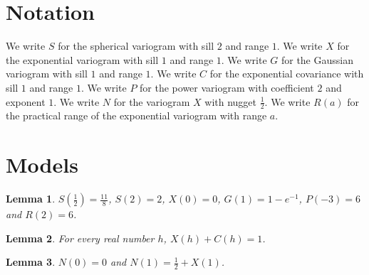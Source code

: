 \documentclass{article}
\newtheorem{lemma}{Lemma}
\begin{document}
\section{Notation}

We write $S$ for the spherical variogram with sill $2$ and range $1$.
We write $X$ for the exponential variogram with sill $1$ and range $1$.
We write $G$ for the Gaussian variogram with sill $1$ and range $1$.
We write $C$ for the exponential covariance with sill $1$ and range $1$.
We write $P$ for the power variogram with coefficient $2$ and exponent $1$.
We write $N$ for the variogram $X$ with nugget $\frac12$.
We write $R(a)$ for the practical range of the exponential variogram with range $a$.

\section{Models}

\begin{lemma}\label{values}
$S(\frac12)=\frac{11}{8}$, $S(2)=2$, $X(0)=0$, $G(1)=1-e^{-1}$, $P(-3)=6$ and $R(2)=6$.
\end{lemma}

\begin{lemma}\label{covariance}
For every real number $h$, $X(h)+C(h)=1$.
\end{lemma}

\begin{lemma}\label{nugget}
$N(0)=0$ and $N(1)=\frac12+X(1)$.
\end{lemma}
\end{document}
